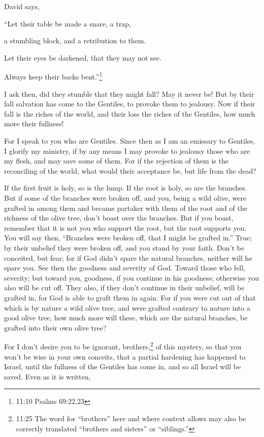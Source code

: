\myverse{}David says,

“Let their table be made a snare, a trap,

a stumbling block, and a retribution to them.

\myverse{}Let their eyes be darkened, that they may not see.

Always keep their backs bent.”\footnote{11:10 Psalms 69:22,23}

\myverse{}I ask then, did they stumble that they might fall? May it never
be! But by their fall salvation has come to the Gentiles, to provoke them to jealousy.
\myverse{}Now if their fall is the riches of the world, and their loss the riches of
the Gentiles, how much more their fullness!

\myverse{}For I speak to you who are Gentiles. Since then as I am an emissary to Gentiles,
I glorify my ministry,
\myverse{}if by any means I may provoke to jealousy those who are my flesh, and may
save some of them.
\myverse{}For if the rejection of them is the reconciling of the world, what would
their acceptance be, but life from the dead?

\myverse{}If the first fruit is holy, so is the lump. If the root is holy,
so are the branches.
\myverse{}But if some of the branches were broken off, and you, being a wild olive,
were grafted in among them and became partaker with them of the root and of the richness of the olive
tree,
\myverse{}don’t boast over the branches. But if you boast, remember that it is not
you who support the root, but the root supports you.
\myverse{}You will say then, “Branches were broken off, that I might be grafted in.”
\myverse{}True; by their unbelief they were broken off, and you stand by your faith.
Don’t be conceited, but fear;
\myverse{}for if God didn’t spare the natural branches, neither will he spare you.
\myverse{}See then the goodness and severity of God. Toward those who fell, severity;
but toward you, goodness, if you continue in his goodness; otherwise you also will be cut off.
\myverse{}They also, if they don’t continue in their unbelief, will be grafted in,
for God is able to graft them in again.
\myverse{}For if you were cut out of that which is by nature a wild olive tree, and
were grafted contrary to nature into a good olive tree, how much more will these, which are the natural
branches, be grafted into their own olive tree?

\myverse{}For I don’t desire you to be ignorant, brothers,\footnote{11:25 The word for “brothers” here and where context allows may also be correctly translated “brothers and sisters” or “siblings.”} of this mystery, so that you won’t be wise in your own conceits, that a partial hardening has happened to Israel, until the fullness of the Gentiles has come in,
\myverse{}and so all Israel will be saved. Even as it is written,

